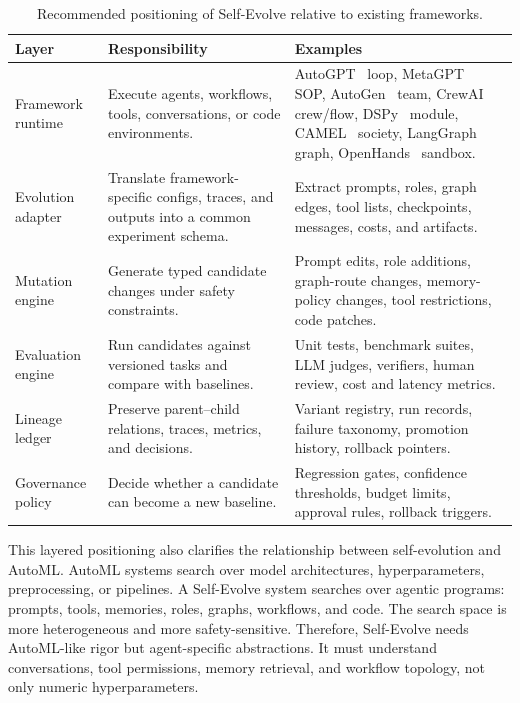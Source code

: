 \begin{table}[t]
\centering
\small
\caption{Recommended positioning of Self-Evolve relative to existing frameworks.}
\label{tab:self-evolve-positioning}
\begin{tabular}{p{}p{}p{}}
\hline
\textbf{Layer} & \textbf{Responsibility} & \textbf{Examples} \\
\hline
Framework runtime & Execute agents, workflows, tools, conversations, or code environments. & AutoGPT~\cite{autogpt2023} loop, MetaGPT~\cite{metagpt2023} SOP, AutoGen~\cite{autogen2023} team, CrewAI~\cite{crewai2024} crew/flow, DSPy~\cite{dspy2023} module, CAMEL~\cite{camel2023} society, LangGraph~\cite{langgraph2024} graph, OpenHands~\cite{openhands2024} sandbox. \\
Evolution adapter & Translate framework-specific configs, traces, and outputs into a common experiment schema. & Extract prompts, roles, graph edges, tool lists, checkpoints, messages, costs, and artifacts. \\
Mutation engine & Generate typed candidate changes under safety constraints. & Prompt edits, role additions, graph-route changes, memory-policy changes, tool restrictions, code patches. \\
Evaluation engine & Run candidates against versioned tasks and compare with baselines. & Unit tests, benchmark suites, LLM judges, verifiers, human review, cost and latency metrics. \\
Lineage ledger & Preserve parent--child relations, traces, metrics, and decisions. & Variant registry, run records, failure taxonomy, promotion history, rollback pointers. \\
Governance policy & Decide whether a candidate can become a new baseline. & Regression gates, confidence thresholds, budget limits, approval rules, rollback triggers. \\
\hline
\end{tabular}
\end{table}

This layered positioning also clarifies the relationship between self-evolution and AutoML.  AutoML systems search over model architectures, hyperparameters, preprocessing, or pipelines.  A Self-Evolve system searches over agentic programs: prompts, tools, memories, roles, graphs, workflows, and code.  The search space is more heterogeneous and more safety-sensitive.  Therefore, Self-Evolve needs AutoML-like rigor but agent-specific abstractions.  It must understand conversations, tool permissions, memory retrieval, and workflow topology, not only numeric hyperparameters.

